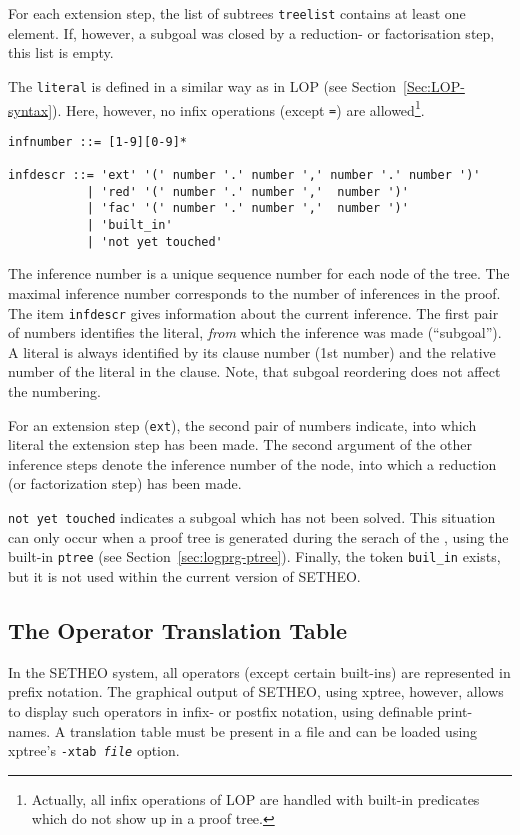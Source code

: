 For each extension step, the list of subtrees {\tt treelist} contains
at least one element. If, however, a subgoal was closed by a reduction-
or factorisation step,  this list is empty.

The {\tt literal} is defined in a similar way as in LOP (see Section~\ref{Sec:LOP-syntax}). Here, however, no infix operations 
(except {\tt =}) are allowed\footnote{
	Actually, all infix operations of LOP are handled with
	built-in predicates which do not show up in a proof tree.
	}.

\begin{verbatim}
infnumber ::= [1-9][0-9]*

infdescr ::= 'ext' '(' number '.' number ',' number '.' number ')'
           | 'red' '(' number '.' number ','  number ')'
           | 'fac' '(' number '.' number ','  number ')'
           | 'built_in'
           | 'not yet touched'
\end{verbatim}

The inference number is a unique sequence number for each node of the
tree. The maximal inference number corresponds to the number of inferences
in the proof. The item {\tt infdescr} gives information about the
current inference. The first pair of numbers identifies the literal,
{\em from\/} which the inference was made (``subgoal'').
A literal is always identified by its clause number (1st number) and
the relative number of the literal in the clause. Note, that subgoal
reordering does not affect the numbering.

For an extension step ({\tt ext}), the second pair of numbers indicate,
into which literal the extension step has been made.
The second argument of the other inference steps denote the inference
number of the node, into which a reduction (or factorization step)
has been made.

{\tt not yet touched} indicates a subgoal which has not been solved.
This situation can only occur when a proof tree is generated during
the serach of the \SAM, using the built-in {\tt ptree} 
(see Section~\ref{sec:logprg-ptree}).
Finally, the token {\tt buil\_in} exists, but it is not used within the
current version of SETHEO.

\subsection{The Operator Translation Table}
\label{sec:file-formats:opdefs}

In the SETHEO system, all operators (except certain built-ins) are
represented in prefix notation.
The graphical output of SETHEO, using xptree, however, allows to
display such operators in infix- or postfix notation, using definable
print-names.
A translation table must be present in a file and can be loaded using
xptree's {\tt -xtab {\em file}} option.

